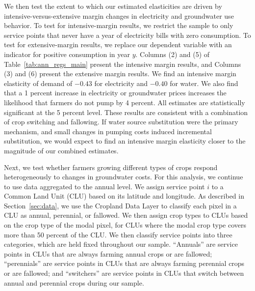 We then test the extent to which our estimated elasticities are driven by intensive-versus-extensive margin changes in electricity and groundwater use behavior. To test for intensive-margin results, we restrict the sample to only service points that never have a year of electricity bills with zero consumption. To test for extensive-margin results, we replace our dependent variable with an indicator for positive consumption in year $y$. Columns (2) and (5) of Table~\ref{tab:ann_regs_main} present the intensive margin results, and Columns (3) and (6) present the extensive margin results. We find an intensive margin elasticity of demand of $-0.43$ for electricity and $-0.40$ for water. We also find that a 1 percent increase in electricity or groundwater prices increases the likelihood that farmers do not pump by 4 percent. All estimates are statistically significant at the 5 percent level. These results are consistent with a combination of crop switching and fallowing. If water source substitution were the primary mechanism, and small changes in pumping costs induced incremental substitution, we would expect to find an intensive margin elasticity closer to the magnitude of our combined estimates.



Next, we test whether farmers growing different types of crops respond heterogeneously to changes in groundwater costs. For this analysis, we continue to use data aggregated to the annual level. We assign service point $i$ to a Common Land Unit (CLU) based on its latitude and longitude. As described in Section~\ref{sec:data}, we use the Cropland Data Layer to classify each pixel in a CLU as annual, perennial, or fallowed. We then assign crop types to CLUs based on the crop type of the modal pixel, for CLUs where the modal crop type covers more than 50 percent of the CLU. We then classify service points into three categories, which are held fixed throughout our sample. ``Annuals'' are service points in CLUs that are always farming annual crops or are fallowed; ``perennials'' are service points in CLUs that are always farming perennial crops or are fallowed; and ``switchers'' are service points in CLUs that switch between annual and perennial crops during our sample. 

